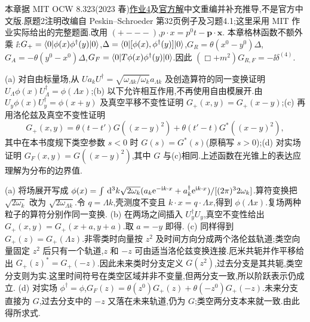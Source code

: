 本章据 MIT OCW 8.323(2023 春)\href{https://ocw.mit.edu/courses/8-323-relativistic-quantum-field-theory-i-spring-2023/mit8_323_s23_pset04.pdf}{作业4}及\href{https://ocw.mit.edu/courses/8-323-relativistic-quantum-field-theory-i-spring-2023/mit8_323_s23_pset_04sol.pdf}{官方解}中文重编并补充推导,不是官方中文版.原题2注明改编自 Peskin--Schroeder 第32页例子及习题4.1;这里采用 MIT 作业实际给出的完整题面.改用 $(+---)$,$p\cdot x=p^0t-\mathbf p\cdot\mathbf x$.
本章格林函数不额外乘 $\ii$:$G_+=\langle 0\rvert\phi(x)\phi^\dagger(y)\lvert 0\rangle$,$\Delta=\langle 0\rvert[\phi(x),\phi^\dagger(y)]\lvert 0\rangle$,$G_R=\theta(x^0-y^0)\Delta$,$G_A=-\theta(y^0-x^0)\Delta$,$G_F=\langle 0\rvert T\phi(x)\phi^\dagger(y)\lvert 0\rangle$.因此 $(\Box+m^2)G_{R,F}=-\ii\delta^{(4)}$.

\begin{exercise}
(a) 对自由标量场,从 $Ua_kU^\dagger=\sqrt{\omega_{\Lambda k}/\omega_k}a_{\Lambda k}$ 及创造算符的同一变换证明 $U_\Lambda\phi(x)U_\Lambda^\dagger=\phi(\Lambda x)$;(b) 以下允许相互作用,不再使用自由模展开.由 $U_y\phi(x)U_y^\dagger=\phi(x+y)$ 及真空平移不变性证明 $G_+(x,y)=G_+(x-y)$;(c) 再用洛伦兹及真空不变性证明
\[
G_+(x,y)=\theta(t-t')G((x-y)^2)+\theta(t'-t)G^*((x-y)^2),
\]
其中在本书度规下类空参数 $s<0$ 时 $G(s)=G^*(s)$(原稿写 $s>0$);(d) 对实场证明 $G_F(x,y)=G((x-y)^2)$,其中 $G$ 与(c)相同.上述函数在光锥上的表达应理解为分布的边界值.
\end{exercise}
\begin{solution}
(a) 将场展开写成 $\phi(x)=\int\,\mathrm d^3k\sqrt{2\omega_k}(a_k\mathrm e^{-\mathrm i k\cdot x}+a_k^\dagger\mathrm e^{\mathrm i k\cdot x})/[(2\pi)^3 2\omega_k]$.算符变换把 $\sqrt{2\omega_k}$ 改为 $\sqrt{2\omega_{\Lambda k}}$.令 $q=\Lambda k$,壳测度不变且 $k\cdot x=q\cdot\Lambda x$,得到 $\phi(\Lambda x)$.复场两种粒子的算符分别作同一变换.
(b) 在两场之间插入 $U_y^\dagger U_y$,真空不变性给出 $G_+(x,y)=G_+(x+a,y+a)$.取 $a=-y$ 即得.
(c) 同样得到 $G_+(z)=G_+(\Lambda z)$.非零类时向量按 $z^2$ 及时间方向分成两个洛伦兹轨道;类空向量固定 $z^2$ 后只有一个轨道,$z$ 和 $-z$ 可由适当洛伦兹变换连接.厄米共轭并作平移给出 $G_+(z)^*=G_+(-z)$.因此未来类时分支定义 $G(z^2)$,过去分支是其共轭,类空分支则为实.这里时间符号在类空区域并非不变量,但两分支一致,所以阶跃表示仍成立.
(d) 对实场 $\phi^\dagger=\phi$,$G_F(z)=\theta(z^0)G_+(z)+\theta(-z^0)G_+(-z)$.未来分支直接为 $G$,过去分支中的 $-z$ 又落在未来轨道,仍为 $G$;类空两分支本来就一致.由此得所求式.
\end{solution}

